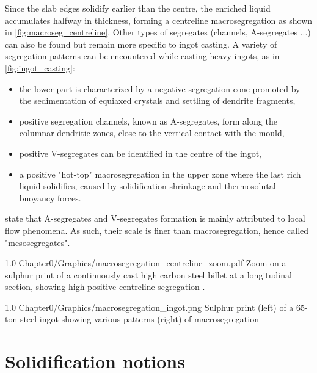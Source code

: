 Since the slab edges solidify earlier than the centre, the enriched liquid accumulates halfway in thickness, forming a centreline macrosegregation
as shown in \cref{fig:macroseg_centreline}. Other types of segregates (channels, A-segregates ...) can also be found but remain more specific to ingot casting. 
A variety of segregation patterns can be encountered while casting heavy ingots, as in \cref{fig:ingot_casting}: 
\begin{itemize}
\itemsep0em 
\item the lower part is characterized by a negative segregation cone promoted by the sedimentation of 
	  equiaxed crystals and settling of dendrite fragments,
\item positive segregation channels, known as A-segregates, form along the columnar dendritic zones, close to the vertical contact with the mould,
\item positive V-segregates can be identified in the centre of the ingot,
\item a positive "hot-top" macrosegregation in the upper zone where the last rich liquid solidifies, caused by solidification shrinkage and thermosolutal buoyancy forces. 
\end{itemize}
\citet{combeau_prediction_2009} state that A-segregates and V-segregates formation is mainly attributed to local flow phenomena.
As such, their scale is finer than macrosegregation, hence called "mesosegregates".
\begin{figureth}
{1.0}
{Chapter0/Graphics/macrosegregation_centreline_zoom.pdf}
{Zoom on a sulphur print of a continuously cast high carbon steel billet at a longitudinal section, showing high positive centreline segregation \citep{choudhary_morphology_2007}.}
\label{fig:macroseg_centreline}
\end{figureth}
%
\begin{figureth}
{1.0}
{Chapter0/Graphics/macrosegregation_ingot.png}
{Sulphur print (left) of a 65-ton steel ingot \citep{lesoult_macrosegregation_2005} showing various patterns (right) of macrosegregation \citep{flemings_solidification_1974}}
\label{macrosegregation_ingot}
\end{figureth}
%
\section{Solidification notions}
%

